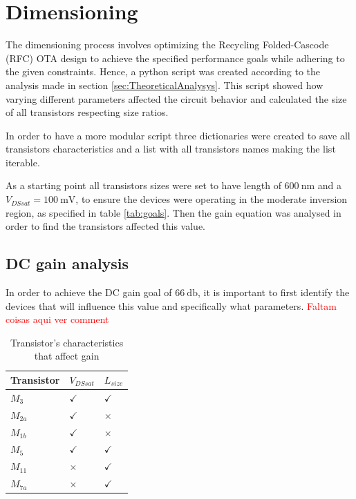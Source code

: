 \section{Dimensioning}

The dimensioning process involves optimizing the Recycling Folded-Cascode (RFC) OTA design to achieve the specified performance goals while adhering to the given constraints. Hence, a python script was created according to the analysis made in section \ref{sec:TheoreticalAnalysys}. This script showed how varying different parameters affected the circuit behavior and calculated the size of all transistors respecting size ratios. 

In order to have a more modular script three dictionaries were created to save all transistors characteristics and a list with all transistors names making the list iterable.

As a starting point all transistors sizes were set to have length of $\SI{600}{\nano\meter}$ and a $V_{DSsat} = \SI{100}{\milli\volt}$, to ensure the devices were operating in the moderate inversion region, as specified in table \ref{tab:goals}. Then the gain equation was analysed in order to find the transistors affected this value.

\subsection{DC gain analysis}
\label{sec:DCGain}
In order to achieve the DC gain goal of $\SI{66}{\decibel}$, it is important to first identify the devices that will influence this value and specifically what parameters. \textcolor{red}{Faltam coisas aqui ver comment}


\begin{table}[H]
    \centering
    \caption{Transistor's characteristics that affect gain}
    \begin{tabularx}{\textwidth}{>{\centering\arraybackslash}X >{\centering\arraybackslash}X >{\centering\arraybackslash}X}
        \toprule
        \textbf{Transistor} & \textbf{$V_{DSsat}$} & \textbf{$L_{size}$} \\
        \midrule
        $M_{3}$ & $\checkmark$ & $\checkmark$\\
        \midrule
        $M_{2a}$ & $\checkmark$ & $\times$\\
        \midrule
        $M_{1b}$ & $\checkmark$ & $\times$\\
        \midrule
        $M_{5}$ & $\checkmark$ & $\checkmark$\\
        \midrule
        $M_{11}$ & $\times$ & $\checkmark$\\
        \midrule
        $M_{7a}$ & $\times$ & $\checkmark$\\
        \bottomrule
    \end{tabularx}
    \label{tab:GainTransistors}
\end{table}


